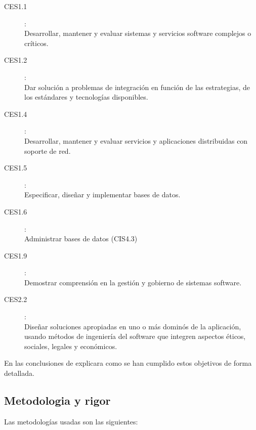 \begin{description}
	\item[CES1.1]:\\Desarrollar, mantener y evaluar sistemas y servicios software complejos o críticos.
	\item[CES1.2]:\\Dar solución a problemas de integración en función de las estrategias, de los estándares y tecnologías disponibles.
	\item[CES1.4]:\\Desarrollar, mantener y evaluar servicios y aplicaciones distribuidas con soporte de red.
	\item[CES1.5]:\\Especificar, diseñar y implementar bases de datos.
	\item[CES1.6]:\\Administrar bases de datos (CIS4.3)
	\item[CES1.9]:\\Demostrar comprensión en la gestión y gobierno de sistemas software.
	\item[CES2.2]:\\Diseñar soluciones apropiadas en uno o más dominós de la aplicación, usando métodos de ingeniería del software que integren aspectos éticos, sociales, legales y económicos. 
\end{description}

En las conclusiones de explicara como se han cumplido estos objetivos de forma detallada.


\subsection{Metodologia y rigor}
Las metodologías usadas son las siguientes:

